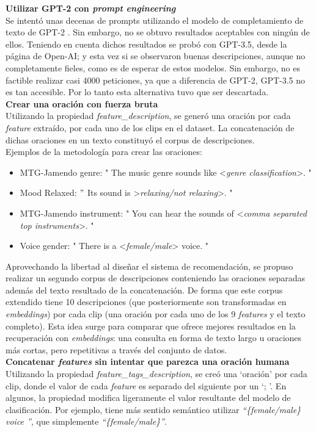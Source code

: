 \textbf{Utilizar GPT-2 con \textit{prompt engineering}}\\
Se intentó unas decenas de prompts utilizando el modelo de completamiento de texto de GPT-2 \cite{radford2019language, HggFaceGPT2}. Sin embargo, no se obtuvo resultados aceptables con ningún de ellos. Teniendo en cuenta dichos resultados se probó con GPT-3.5, desde la página de Open-AI; y esta vez si se observaron buenas descripciones, aunque no completamente fieles, como es de esperar de estos modelos. Sin embargo, no es factible realizar casi 4000 peticiones, ya que a diferencia de GPT-2, GPT-3.5 no es tan accesible. Por lo tanto esta alternativa tuvo que ser descartada.\\

\textbf{Crear una oración con fuerza bruta}\\
Utilizando la propiedad \textit{feature\_description}, se generó una oración por cada \textit{feature} extraído, por cada uno de los clips en el dataset. La concatenación de dichas oraciones en un texto constituyó el corpus de descripciones. \\
Ejemplos de la metodología para crear las oraciones:
\begin{itemize}
    \item MTG-Jamendo genre: " The music genre sounds like <\textit{genre classification}>. "
    \item Mood Relaxed: $"$ Its sound is >\textit{relaxing/not relaxing}>. "
    \item MTG-Jamendo instrument: " You can hear the sounds of <\textit{comma separated top instruments}>. "
    \item Voice gender: " There is a <\textit{female/male}> voice. "
\end{itemize}
Aprovechando la libertad al diseñar el sistema de recomendación, se propuso realizar un segundo corpus de descripciones conteniendo las oraciones separadas además del texto resultado de la concatenación. De forma que este corpus extendido tiene 10 descripciones (que posteriormente son transformadas en \textit{embeddings}) por cada clip (una oración por cada uno de los 9 \textit{features} y el texto completo). Esta idea surge para comparar que ofrece mejores resultados en la recuperación con \textit{embeddings}: una consulta en forma de texto largo u oraciones más cortas, pero repetitivas a través del conjunto de datos.\\

\textbf{Concatenar \textit{features} sin intentar que parezca una oración humana}\\
Utilizando la propiedad \textit{feature\_tags\_description}, se creó una `oración' por cada clip, donde el valor de cada \textit{feature} es separado del siguiente por un `; '. En algunos, la propiedad modifica ligeramente el valor resultante del modelo de clasificación. Por ejemplo, tiene más sentido semántico utilizar \textit{``\{female/male\} voice ''}, que simplemente \textit{``\{female/male\}''}.\\

